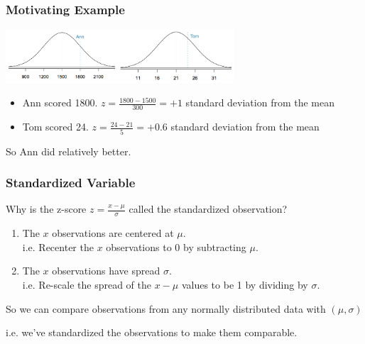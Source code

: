 \documentclass[slides]{beamer}
\newcommand{\blue}[1]{\textcolor{blue2}{#1}}
\begin{document}
\begin{frame}
\frametitle{Motivating Example}
\begin{center}
\includegraphics[height=2cm]{figure/ann.png}\includegraphics[height=2cm]{figure/tom.png}
\end{center}
\begin{itemize}
\item Ann scored 1800. $z=\frac{1800-1500}{300} = +1$ standard deviation from the mean
\item Tom scored 24. $z=\frac{24-21}{5} = +0.6$ standard deviation from the mean
\end{itemize}

So Ann did relatively better.  

\vspace{0.25cm}

\end{frame}



\begin{frame}
\frametitle{Standardized Variable}
Why is the z-score $z=\frac{x-\mu}{\sigma}$ called the \blue{standardized observation}?  

\begin{enumerate}
\pause\item The $x$ observations are \blue{centered} at $\mu$.\\
i.e. Recenter the $x$ observations to 0 by subtracting $\mu$.
\pause\item The $x$ observations have \blue{spread} $\sigma$.\\
i.e. Re-scale the \blue{spread} of the $x-\mu$ values to be 1 by dividing by $\sigma$.
\end{enumerate}


\pause So we can compare observations from \blue{any} normally distributed data with $(\mu,\sigma)$

\vspace{0.25cm}

\pause i.e. we've \blue{standardized the observations} to make them comparable.
\end{frame}
\end{document}
